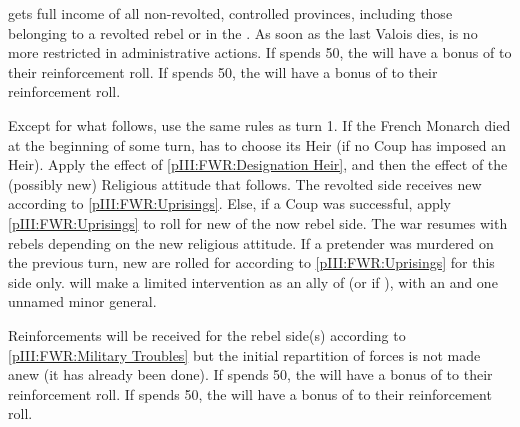 \phadm
\aparag \FRA gets full income of all non-revolted, controlled provinces,
including those belonging to a revolted rebel or in the \ROTW.
\aparag As soon as the last Valois dies, \FRA is no more restricted in
administrative actions.
\bparag If \LIG spends 50\ducats, the \lig will have a bonus of  to
their reinforcement roll.
\bparag If \HUG spends 50\ducats, the \hug will have a bonus of  to
their reinforcement roll.


\phevnt
\aparag Except for what follows, use the same rules as turn 1.
\aparag If the French Monarch  died at the beginning of
some turn, \FRA has to choose its Heir (if no Coup has imposed an Heir). Apply
the effect of \ref{pIII:FWR:Designation Heir}, and then the effect of the
(possibly new) Religious attitude that follows. The revolted side receives new
\REVOLT according to \ref{pIII:FWR:Uprisings}.
\aparag Else, if a Coup was successful, apply \ref{pIII:FWR:Uprisings} to roll
for new \REVOLT of the now rebel side. The war resumes with rebels depending
on the new religious attitude.
\aparag If a pretender was murdered on the previous turn, new \REVOLT are
rolled for according to \ref{pIII:FWR:Uprisings} for this side only.
\aparag \paysSavoie will make a limited intervention as an ally of \lig (or
\FRA if \CATHCR), with an \ARMY \faceplus and one unnamed minor general.

\phadm
{}
\bparag Reinforcements will be received for the rebel side(s) according to
\ref{pIII:FWR:Military Troubles} but the initial repartition of forces is not
made anew (it has already been done).
\bparag If \LIG spends 50\ducats, the \lig will have a bonus of  to
their reinforcement roll.
\bparag If \HUG spends 50\ducats, the \hug will have a bonus of  to
their reinforcement roll.

